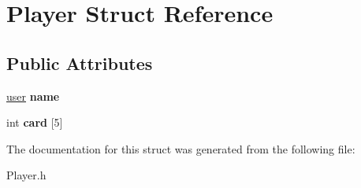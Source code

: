 \hypertarget{struct_player}{\section{Player Struct Reference}
\label{struct_player}
}
\subsection*{Public Attributes}
\begin{DoxyCompactItemize}
\item 
\hypertarget{struct_player_a08aee15907405b291525b0160930b43f}{\hyperlink{structuser}{user} {\bfseries name}}\label{struct_player_a08aee15907405b291525b0160930b43f}

\item 
\hypertarget{struct_player_a159ca92e80941a7973894c79e50c262a}{int {\bfseries card} \mbox{[}5\mbox{]}}\label{struct_player_a159ca92e80941a7973894c79e50c262a}

\end{DoxyCompactItemize}


The documentation for this struct was generated from the following file\-:\begin{DoxyCompactItemize}
\item 
Player.\-h\end{DoxyCompactItemize}
